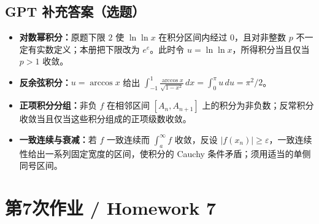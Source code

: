 \documentclass[UTF8,11pt, a4paper, oneside, fontset=none]{ctexbook}
\begin{document}
\subsection*{GPT 补充答案（选题）}
\begin{itemize}
\item \textbf{对数幂积分：}原题下限 $2$ 使 $\ln\ln x$ 在积分区间内经过 $0$，且对非整数 $p$ 不一定有实数定义；本册把下限改为 $e^e$。此时令 $u=\ln\ln x$，所得积分当且仅当 $p>1$ 收敛。
\item \textbf{反余弦积分：}$u=\arccos x$ 给出 $\int_{-1}^1\frac{\arccos x}{\sqrt{1-x^2}}\,dx=\int_0^\pi u\,du=\pi^2/2$。
\item \textbf{正项积分分组：}非负 $f$ 在相邻区间 $[A_n,A_{n+1}]$ 上的积分为非负数；反常积分收敛当且仅当这些积分组成的正项级数收敛。
\item \textbf{一致连续与衰减：}若 $f$ 一致连续而 $\int_a^\infty f$ 收敛，反设 $|f(x_n)|\ge\varepsilon$，一致连续性给出一系列固定宽度的区间，使积分的 Cauchy 条件矛盾；须用适当的单侧同号区间。
\end{itemize}
\clearpage
\section{第7次作业 / Homework 7}
\end{document}
